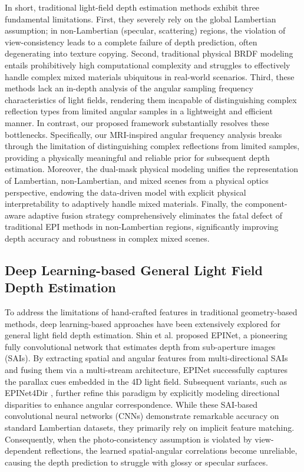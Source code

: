 \documentclass[lettersize,journal]{IEEEtran}
\begin{document}
In short, traditional light-field depth estimation methods exhibit three fundamental limitations. First, they severely rely on the global Lambertian assumption; in non-Lambertian (specular, scattering) regions, the violation of view-consistency leads to a complete failure of depth prediction, often degenerating into texture copying. Second, traditional physical BRDF modeling entails prohibitively high computational complexity and struggles to effectively handle complex mixed materials ubiquitous in real-world scenarios. Third, these methods lack an in-depth analysis of the angular sampling frequency characteristics of light fields, rendering them incapable of distinguishing complex reflection types from limited angular samples in a lightweight and efficient manner. In contrast, our proposed framework substantially resolves these bottlenecks. Specifically, our MRI-inspired angular frequency analysis breaks through the limitation of distinguishing complex reflections from limited samples, providing a physically meaningful and reliable prior for subsequent depth estimation. Moreover, the dual-mask physical modeling unifies the representation of Lambertian, non-Lambertian, and mixed scenes from a physical optics perspective, endowing the data-driven model with explicit physical interpretability to adaptively handle mixed materials. Finally, the component-aware adaptive fusion strategy comprehensively eliminates the fatal defect of traditional EPI methods in non-Lambertian regions, significantly improving depth accuracy and robustness in complex mixed scenes.

\subsection{Deep Learning-based General Light Field Depth Estimation}

To address the limitations of hand-crafted features in traditional geometry-based methods, deep learning-based approaches have been extensively explored for general light field depth estimation. Shin et al. \cite{EPINetsubapertureimages} proposed EPINet, a pioneering fully convolutional network that estimates depth from sub-aperture images (SAIs). By extracting spatial and angular features from multi-directional SAIs and fusing them via a multi-stream architecture, EPINet successfully captures the parallax cues embedded in the 4D light field. Subsequent variants, such as EPINet4Dir \cite{EPINet4DirdirectionalSAIs}, further refine this paradigm by explicitly modeling directional disparities to enhance angular correspondence. While these SAI-based convolutional neural networks (CNNs) demonstrate remarkable accuracy on standard Lambertian datasets, they primarily rely on implicit feature matching. Consequently, when the photo-consistency assumption is violated by view-dependent reflections, the learned spatial-angular correlations become unreliable, causing the depth prediction to struggle with glossy or specular surfaces.
\end{document}
